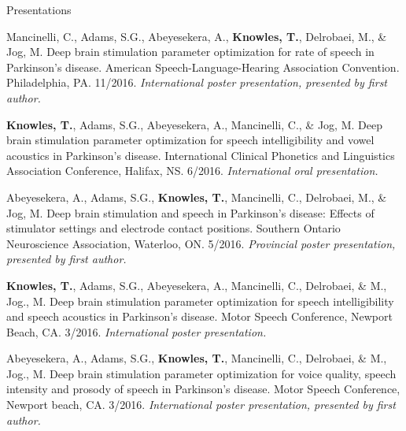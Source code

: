 \documentclass{resume} %
\begin{document}
\begin{rSection}{Presentations}
\begin{etaremune}
\item Mancinelli, C., Adams, S.G., Abeyesekera, A., {\bf Knowles, T.}, Delrobaei, M., \& Jog, M. Deep brain stimulation parameter optimization for rate of speech in Parkinson's disease. American Speech-Language-Hearing Association Convention. Philadelphia, PA. 11/2016. \emph{International poster presentation, presented by first author.}
	
\item {\bf Knowles, T.}, Adams, S.G., Abeyesekera, A., Mancinelli, C., \& Jog, M. Deep brain stimulation parameter optimization for speech intelligibility and vowel acoustics in Parkinson's disease. International Clinical Phonetics and Linguistics Association Conference, Halifax, NS. 6/2016. \emph{International oral presentation.}
	
\item Abeyesekera, A., Adams, S.G., {\bf Knowles, T.}, Mancinelli, C., Delrobaei, M., \& Jog, M. Deep brain stimulation and speech in Parkinson's disease: Effects of stimulator settings and electrode contact positions. Southern Ontario Neuroscience Association, Waterloo, ON. 5/2016. \emph{Provincial poster presentation, presented by first author.}
	
	
	
\item {\bf Knowles, T.}, Adams, S.G., Abeyesekera, A., Mancinelli, C., Delrobaei, \& M., Jog., M. Deep brain stimulation parameter optimization for speech intelligibility and speech acoustics in Parkinson's disease. Motor Speech Conference, Newport Beach, CA. 3/2016. \emph{International poster presentation.}
	
\item Abeyesekera, A., Adams, S.G., {\bf Knowles, T.}, Mancinelli, C., Delrobaei, \& M., Jog., M. Deep brain stimulation parameter optimization for voice quality, speech intensity and prosody of speech in Parkinson's disease. Motor Speech Conference, Newport beach, CA. 3/2016. \emph{International poster presentation, presented by first author.}
	
	

\end{etaremune}
\end{rSection}
\end{document}
